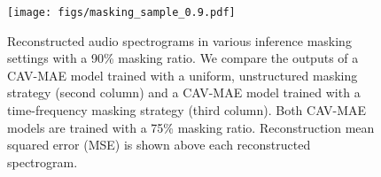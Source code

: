 \documentclass{article} \usepackage{iclr2023_conference,times}
\begin{document}
\begin{figure}[t]
\centering
\texttt{[image: figs/masking\_sample\_0.9.pdf]}
\caption{Reconstructed audio spectrograms in various inference masking settings with a 90\% masking ratio. We compare the outputs of a CAV-MAE model trained with a uniform, unstructured masking strategy (second column) and a CAV-MAE model trained with a time-frequency masking strategy (third column). Both CAV-MAE models are trained with a 75\% masking ratio. Reconstruction mean squared error (MSE) is shown above each reconstructed spectrogram.}
\label{fig:mask_spec_0.9}
\end{figure}
\end{document}
